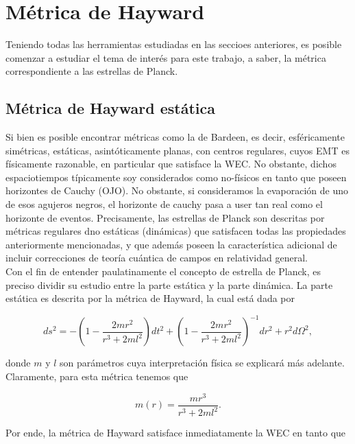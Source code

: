 \documentclass{article}
\numberwithin{equation}{section}
\theoremstyle{definition}
\begin{document}
\section{\label{planck stars section} Métrica de Hayward}

Teniendo todas las herramientas estudiadas en las seccioes anteriores, es posible comenzar a estudiar el tema de interés para este trabajo, a saber, la métrica correspondiente a las estrellas de Planck.

\subsection{Métrica de Hayward estática}

Si bien es posible encontrar métricas como la de Bardeen, es decir, esféricamente simétricas, estáticas, asintóticamente planas, con centros regulares, cuyos EMT es físicamente razonable, en particular que satisface la WEC. No obstante, dichos espaciotiempos típicamente soy considerados como no-físicos en tanto que poseen horizontes de Cauchy (OJO). No obstante, si consideramos la evaporación de uno de esos agujeros negros, el horizonte de cauchy pasa a user tan real como el horizonte de eventos.  Precisamente, las estrellas de Planck son descritas por métricas regulares dno estáticas (dinámicas) que satisfacen todas las propiedades anteriormente mencionadas, y que además poseen la característica adicional de incluir correcciones de teoría cuántica de campos en relatividad general.\\

Con el fin de entender paulatinamente el concepto de estrella de Planck, es preciso dividir su estudio entre la parte estática y la parte dinámica. La parte estática es descrita por la métrica de Hayward, la cual está dada por 

\begin{equation}
\label{hayward metric}
ds^2 = -\left( 1 - \frac{2mr^2}{r^3 + 2ml^2} \right) dt^2 + \left( 1 - \frac{2mr^2}{r^3 + 2ml^2} \right)^{-1} dr^2 + r^2d\Omega ^2,
\end{equation}

donde $m$ y $l$ son parámetros cuya interpretación física se explicará más adelante. Claramente, para esta métrica tenemos que

\begin{equation}
\label{hayward mass}
m(r) =  \frac{mr^3}{r^3 + 2ml^2}.
\end{equation}

Por ende, la métrica de Hayward satisface inmediatamente la WEC en tanto que 
\end{document}
